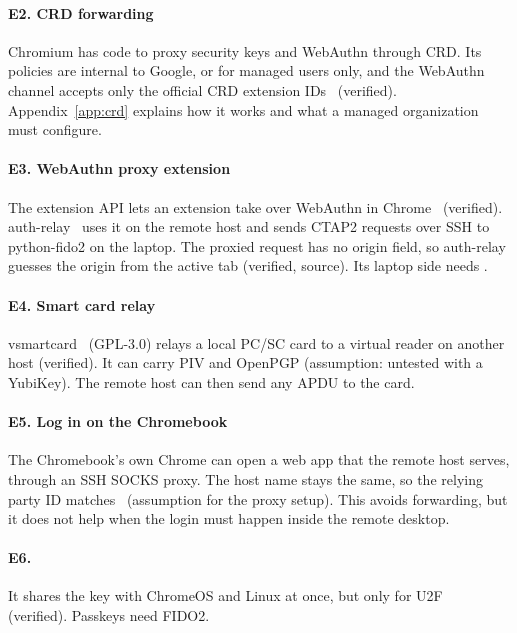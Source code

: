 \paragraph{E2. CRD forwarding} Chromium has code to proxy security keys and
WebAuthn through CRD. Its policies are internal to Google, or for managed
users only, and the WebAuthn channel accepts only the official CRD extension
IDs~\cite{crdpol} (verified). Appendix~\ref{app:crd} explains how it works
and what a managed organization must configure.

\paragraph{E3. WebAuthn proxy extension} The extension API
 lets an extension take over WebAuthn in
Chrome~\cite{wap} (verified). auth-relay~\cite{authrelay} uses it on the
remote host and sends CTAP2 requests over SSH to python-fido2 on the laptop.
The proxied request has no origin field, so auth-relay guesses the origin
from the active tab (verified, source). Its laptop side needs .

\paragraph{E4. Smart card relay} vsmartcard~\cite{vsmartcard} (GPL-3.0)
relays a local PC/SC card to a virtual reader on another host (verified). It
can carry PIV and OpenPGP (assumption: untested with a YubiKey). The remote
host can then send any APDU to the card.

\paragraph{E5. Log in on the Chromebook} The Chromebook's own Chrome can open
a web app that the remote host serves, through an SSH SOCKS proxy. The host
name stays the same, so the relying party ID matches~\cite{webauthn3}
(assumption for the proxy setup). This avoids forwarding, but it does not help
when the login must happen inside the remote desktop.

\paragraph{E6. } It shares the key with ChromeOS and
Linux at once, but only for U2F~\cite{crosvmdev} (verified). Passkeys need
FIDO2.
